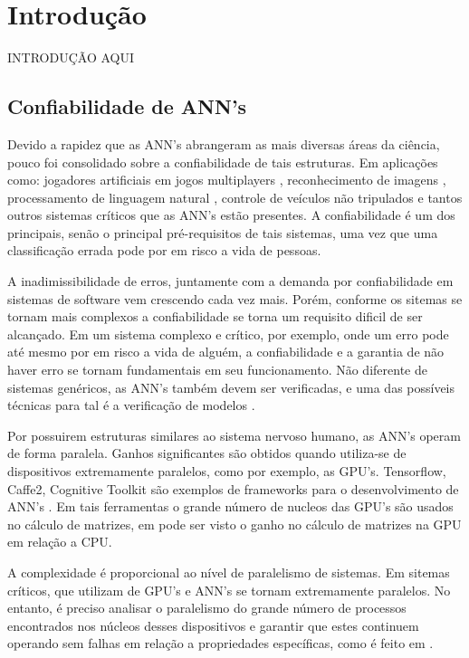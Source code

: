 
\chapter{Introdução} %
INTRODUÇÃO AQUI
\section{Confiabilidade de ANN's}
 Devido a rapidez que as ANN's abrangeram as mais diversas áreas da ciência, pouco foi consolidado sobre a confiabilidade de tais estruturas. Em aplicações como: jogadores artificiais em jogos multiplayers \cite{Silver2017}, reconhecimento de imagens \cite{olga2015}, processamento de linguagem natural \cite{goldberg2015}, controle de veículos não tripulados \cite{bojarski2016} e  tantos outros sistemas críticos que as ANN's estão presentes. A confiabilidade é um dos principais, senão o principal pré-requisitos de tais sistemas, uma vez que uma classificação errada pode por em risco a vida de pessoas.
 
 
 A inadimissibilidade de erros, juntamente com a demanda por confiabilidade em sistemas de software vem crescendo cada vez mais. Porém, conforme os sitemas se tornam mais complexos a confiabilidade se torna um requisito dificil de ser alcançado. Em um sistema complexo e crítico, por exemplo, onde um erro pode até mesmo por em risco a vida de alguém, a confiabilidade e a garantia de não haver erro se tornam fundamentais em seu funcionamento. Não diferente de sistemas genéricos, as ANN's também devem ser verificadas, e uma das possíveis técnicas para tal é a verificação de modelos \cite{jhala2009}. 
 
 Por possuirem estruturas similares ao sistema nervoso humano, as ANN's operam de forma paralela. Ganhos significantes são obtidos quando utiliza-se de dispositivos extremamente paralelos, como por exemplo, as GPU's. Tensorflow, Caffe2, Cognitive Toolkit são exemplos de frameworks para o desenvolvimento de ANN's \cite{bahrampour2015}. Em tais ferramentas o grande número de nucleos das GPU's são usados no cálculo de matrizes, em \cite{oshima2007} pode ser visto o ganho no cálculo de matrizes na GPU em relação a CPU.
 
 A complexidade é proporcional ao nível de paralelismo de sistemas. Em sitemas críticos, que utilizam de GPU's e ANN's se tornam extremamente paralelos. No entanto, é preciso analisar o paralelismo do grande número de processos encontrados nos núcleos desses dispositivos e garantir que estes continuem operando sem falhas em relação a propriedades específicas, como é feito em \cite{monteiro2018}.
 
